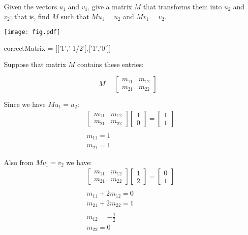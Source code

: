 \documentclass{ximera}
\begin{document}
\begin{question}
Given the vectors $u_1$ and $v_1$, give a matrix $M$ that transforms them
into $u_2$ and $v_2$; that is, find $M$ such that $M u_1=u_2$ and $M v_1=v_2$.

\begin{image}
\texttt{[image: fig.pdf]}
\end{image}

\begin{solution}
\begin{matrix-answer}[name=M]
    correctMatrix = [['1','-1/2'],['1','0']]
\end{matrix-answer}
\end{solution}

Suppose that matrix $M$ contains these entries:
\begin{center}
\begin{equation*}
M =
\begin{bmatrix}
m_{11} & m_{12} \\
m_{21} & m_{22}
\end{bmatrix}
\end{equation*}
\end{center}

Since we have $M u_1 = u_2$:
\begin{align*}
&\begin{bmatrix}
m_{11} & m_{12} \\
m_{21} & m_{22}
\end{bmatrix}
\begin{bmatrix}
1 \\
0
\end{bmatrix}
= 
\begin{bmatrix}
1 \\
1
\end{bmatrix} \\
\\
& m_{11} = 1 \\
& m_{21} = 1
\end{align*}

Also from  $M v_1 = v_2$ we have:
\begin{align*}
&\begin{bmatrix}
m_{11} & m_{12} \\
m_{21} & m_{22}
\end{bmatrix}
\begin{bmatrix}
1 \\
2
\end{bmatrix}
= 
\begin{bmatrix}
0 \\
1
\end{bmatrix} \\
\\
& m_{11} + 2 m_{12} = 0 \\
& m_{21} + 2 m_{22} = 1 \\
\\
&m_{12} = - \frac{1}{2} \\
&m_{22} = 0
\end{align*}


\end{question}
\end{document}
